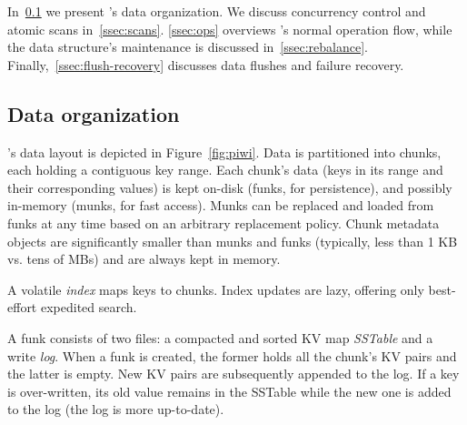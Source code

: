 

In~\cref{ssec:layout} we present \sys's data organization. 
We discuss concurrency control and atomic scans in~\cref{ssec:scans}.
\cref{ssec:ops} overviews \sys's normal %
operation flow, while   the data structure's maintenance is discussed in~\cref{ssec:rebalance}.
Finally,~\cref{ssec:flush-recovery} discusses data flushes and failure recovery.


\subsection{Data organization}
\label{ssec:layout}


\sys's data layout is depicted in Figure~\ref{fig:piwi}.
Data is partitioned into chunks, each holding a contiguous key range.
Each chunk's data 
(keys in its range and their corresponding values) 
is kept on-disk (funks, for persistence), and possibly in-memory (munks, for fast access). 
Munks can be replaced and loaded from funks at any time based on an arbitrary replacement policy.
Chunk metadata objects are significantly smaller than munks and funks
(typically, less than 1 KB vs. tens of MBs) and are always kept in memory.

A volatile \emph{index} maps keys to chunks. 
Index updates are lazy, offering only best-effort expedited search.

A funk consists of two files:  a compacted and sorted KV map \emph{SSTable} %
and a write \emph{log}. When a funk is created, the {former} holds all the chunk's KV pairs and the {latter}  is empty.
New KV pairs are subsequently appended to the  {log}. If a key is over-written, its old value remains in the {SSTable} while the new one  is added to the {log} (the {log} is more up-to-date).



